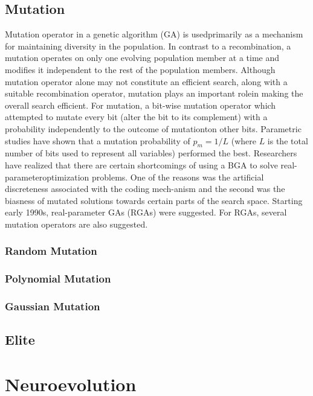\subsection{Mutation}
Mutation operator in a genetic algorithm (GA) is usedprimarily as a mechanism for maintaining
diversity in the population.
In contrast to a recombination, a mutation operates on only one evolving population member at a 
time and modifies it independent to the rest of the population members.
Although mutation operator alone may not constitute an efficient search, along with a suitable 
recombination operator, mutation plays an important rolein making the overall search efficient.
For mutation, a bit-wise mutation operator which attempted to mutate every bit (alter the bit to 
its complement) with a probability independently to the outcome of mutationton other bits.
Parametric studies have shown that a mutation probability of $p_{m}= 1/L$ (where $L$ is the total
number of bits used to represent all variables) performed the best.
Researchers have realized that there are certain shortcomings of using a BGA to solve 
real-parameteroptimization problems. One of the reasons was the artificial discreteness associated
with the coding mech-anism and the second was the biasness of mutated solutions towards certain
parts of the search space.
Starting early 1990s, real-parameter GAs (RGAs) were suggested. 
For RGAs, several mutation operators are also suggested.
\subsubsection{Random Mutation}
\subsubsection{Polynomial Mutation}
\subsubsection{Gaussian Mutation}


\subsection{Elite}

\section{Neuroevolution}


